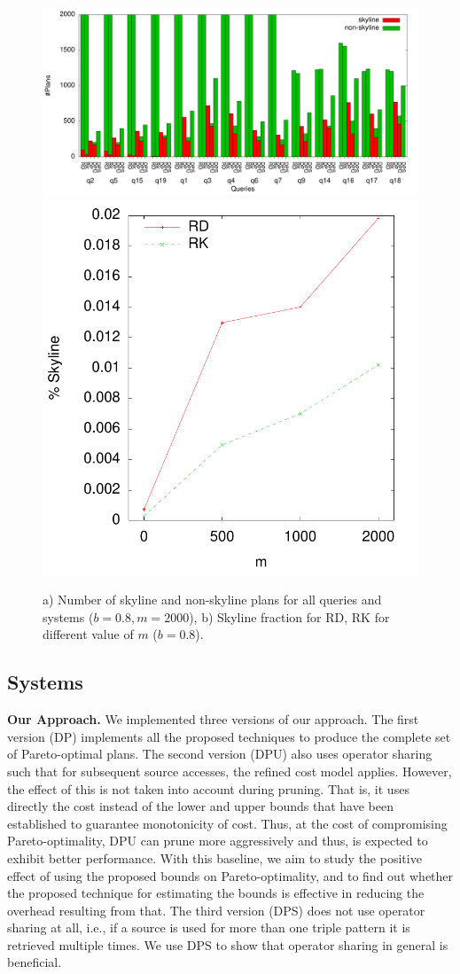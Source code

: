 \begin{figure}[htb]
  \centering
  \includegraphics[width=0.7\linewidth]{figs/all_queries.pdf}
  \includegraphics[width=0.29\linewidth]{figs/plans_skyline_by_m.pdf}
  \caption{a) Number of skyline and non-skyline plans for all queries
    and systems ($b=0.8, m=2000$), b) Skyline fraction for RD, RK for
    different value of $m$ ($b=0.8$).}
  \label{fig:queries}
\end{figure}

\subsection{Systems}
\textbf{Our Approach.} We implemented three versions of our
approach. The first version (DP) implements all the proposed
techniques to produce the complete set of Pareto-optimal plans. The
second version (DPU) also uses operator sharing such that for
subsequent source accesses, the refined cost model applies. However,
the effect of this is not taken into account during pruning.  That is,
it uses directly the cost instead of the lower and upper bounds that
have been established to guarantee monotonicity of cost. Thus, at the
cost of compromising Pareto-optimality, DPU can prune more
aggressively and thus, is expected to exhibit better performance. With
this baseline, we aim to study the positive effect of using the
proposed bounds on Pareto-optimality, and to find out whether the
proposed technique for estimating the bounds is effective in reducing
the overhead resulting from that. The third version (DPS) does not use
operator sharing at all, i.e., if a source is used for more than one
triple pattern it is retrieved multiple times. We use DPS to show that
operator sharing in general is beneficial.


